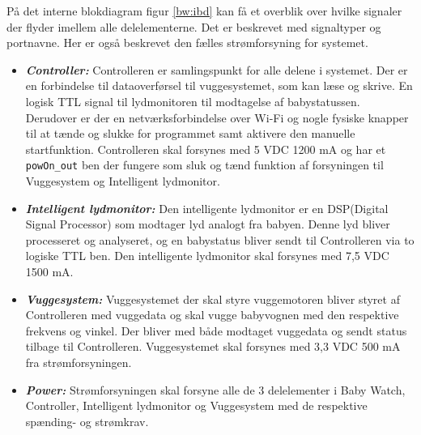 På det interne blokdiagram figur \ref{bw:ibd} kan få et overblik over hvilke signaler der flyder imellem alle delelementerne. Det er beskrevet med signaltyper og portnavne. Her er også beskrevet den fælles strømforsyning for systemet.


\begin{itemize}
\item \textbf{\textit{Controller:}}
Controlleren er samlingspunkt for alle delene i systemet. Der er en \iic forbindelse til dataoverførsel til vuggesystemet, som kan læse og skrive. En logisk TTL signal til lydmonitoren til modtagelse af babystatussen. Derudover er der en netværksforbindelse over Wi-Fi og nogle fysiske knapper til at tænde og slukke for programmet samt aktivere den manuelle startfunktion. Controlleren skal forsynes med 5 VDC 1200 mA og har et \verb+powOn_out+ ben der fungere som sluk og tænd funktion af forsyningen til Vuggesystem og Intelligent lydmonitor.
\item \textbf{\textit{Intelligent lydmonitor:}}
Den intelligente lydmonitor er en DSP(Digital Signal Processor) som modtager lyd analogt fra babyen. Denne lyd bliver processeret og analyseret, og en babystatus bliver sendt til Controlleren via to logiske TTL ben. Den intelligente lydmonitor skal forsynes med 7,5 VDC 1500 mA.
\item \textbf{\textit{Vuggesystem:}}
Vuggesystemet der skal styre vuggemotoren bliver styret af Controlleren med vuggedata og skal vugge babyvognen med den respektive frekvens og vinkel. Der bliver med \iic både modtaget vuggedata og sendt status tilbage til Controlleren. Vuggesystemet skal forsynes med 3,3 VDC 500 mA fra strømforsyningen.
\item \textbf{\textit{Power:}}
Strømforsyningen skal forsyne alle de 3 delelementer i Baby Watch, Controller, Intelligent lydmonitor og Vuggesystem med de respektive spænding- og strømkrav.
\end{itemize}

